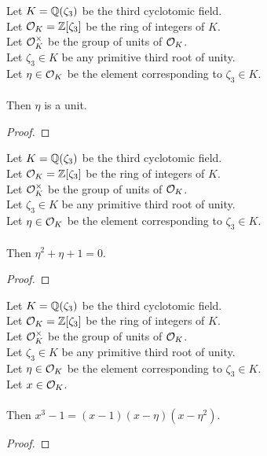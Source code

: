 \begin{lemma}
    \label{lmm:eta_isUnit}
    \leanok
    Let $K = \mathbb{Q}(\zeta_3)$ be the third cyclotomic field. \\
    Let $\mathcal{O}_K = \mathbb{Z}[\zeta_3]$ be the ring of integers of $K$. \\
    Let $\mathcal{O}^\times_K$ be the group of units of $\mathcal{O}_K$. \\
    Let $\zeta_3 \in K$ be any primitive third root of unity. \\
    Let $\eta \in \mathcal{O}_K$ be the element corresponding to $\zeta_3 \in K$. \\\\
    Then $\eta$ is a unit.
\end{lemma}
\begin{proof}
    \leanok
\end{proof}

\begin{lemma}
    \label{lmm:toInteger_eval_cyclo}
    \leanok
    Let $K = \mathbb{Q}(\zeta_3)$ be the third cyclotomic field. \\
    Let $\mathcal{O}_K = \mathbb{Z}[\zeta_3]$ be the ring of integers of $K$. \\
    Let $\mathcal{O}^\times_K$ be the group of units of $\mathcal{O}_K$. \\
    Let $\zeta_3 \in K$ be any primitive third root of unity. \\
    Let $\eta \in \mathcal{O}_K$ be the element corresponding to $\zeta_3 \in K$. \\\\
    Then $\eta^2 + \eta + 1 = 0$.
\end{lemma}
\begin{proof}
    \leanok
\end{proof}

\begin{lemma}
    \label{lmm:cube_sub_one}
    \leanok
    Let $K = \mathbb{Q}(\zeta_3)$ be the third cyclotomic field. \\
    Let $\mathcal{O}_K = \mathbb{Z}[\zeta_3]$ be the ring of integers of $K$. \\
    Let $\mathcal{O}^\times_K$ be the group of units of $\mathcal{O}_K$. \\
    Let $\zeta_3 \in K$ be any primitive third root of unity. \\
    Let $\eta \in \mathcal{O}_K$ be the element corresponding to $\zeta_3 \in K$. \\
    Let $x \in \mathcal{O}_K$. \\\\
    Then $x^3 - 1 = (x - 1)(x - \eta)(x - \eta^ 2)$.
\end{lemma}
\begin{proof}
    \leanok
\end{proof}

